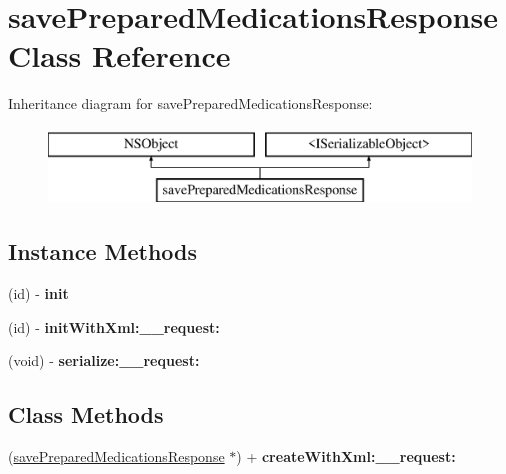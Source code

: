 \hypertarget{interfacesave_prepared_medications_response}{}\section{save\+Prepared\+Medications\+Response Class Reference}
\label{interfacesave_prepared_medications_response}
Inheritance diagram for save\+Prepared\+Medications\+Response\+:\begin{figure}[H]
\begin{center}
\leavevmode
\includegraphics[height=2.000000cm]{interfacesave_prepared_medications_response}
\end{center}
\end{figure}
\subsection*{Instance Methods}
\begin{DoxyCompactItemize}
\item 
\hypertarget{interfacesave_prepared_medications_response_ae0633ab2f1a13948860529bc04c76920}{}(id) -\/ {\bfseries init}\label{interfacesave_prepared_medications_response_ae0633ab2f1a13948860529bc04c76920}

\item 
\hypertarget{interfacesave_prepared_medications_response_a28a323e5775592444030e15c6b86e433}{}(id) -\/ {\bfseries init\+With\+Xml\+:\+\_\+\+\_\+request\+:}\label{interfacesave_prepared_medications_response_a28a323e5775592444030e15c6b86e433}

\item 
\hypertarget{interfacesave_prepared_medications_response_a3bb7a00f66f493db837e6d221418502b}{}(void) -\/ {\bfseries serialize\+:\+\_\+\+\_\+request\+:}\label{interfacesave_prepared_medications_response_a3bb7a00f66f493db837e6d221418502b}

\end{DoxyCompactItemize}
\subsection*{Class Methods}
\begin{DoxyCompactItemize}
\item 
\hypertarget{interfacesave_prepared_medications_response_ae02b867d6a0a0a38dcb5db73c41b128f}{}(\hyperlink{interfacesave_prepared_medications_response}{save\+Prepared\+Medications\+Response} $\ast$) + {\bfseries create\+With\+Xml\+:\+\_\+\+\_\+request\+:}\label{interfacesave_prepared_medications_response_ae02b867d6a0a0a38dcb5db73c41b128f}

\end{DoxyCompactItemize}
